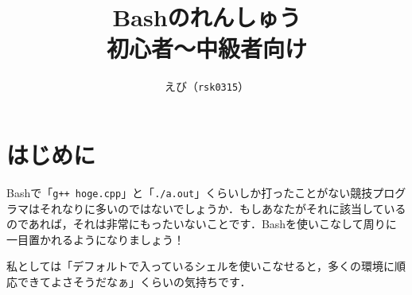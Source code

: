 \documentclass[a4paper]{jsarticle}
\title{
  {\Huge Bashのれんしゅう}\\
  {\LARGE 初心者〜中級者向け}
}
\author{
  えび（{\color{cyan}\texttt{rsk0315}}）
}
\begin{document}
\maketitle

\setcounter{section}{-1}
\section{はじめに}
Bashで「\texttt{g++ hoge.cpp}」と「\texttt{./a.out}」くらいしか打ったことがない競技プログラマはそれなりに多いのではないでしょうか．もしあなたがそれに該当しているのであれば，それは非常にもったいないことです．Bashを使いこなして周りに一目置かれるようになりましょう！

私としては「デフォルトで入っているシェルを使いこなせると，多くの環境に順応できてよさそうだなぁ」くらいの気持ちです．



%

\end{document}
